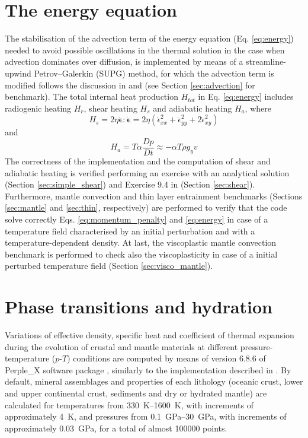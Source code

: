 \documentclass[hidelinks,10pt,a4paper]{article}
\begin{document}
\section{The energy equation}\label{sec:en_eq}
The stabilisation of the advection term of the energy equation (Eq. \ref{eq:energy}) needed to avoid possible oscillations in the thermal solution in the case
when advection dominates over diffusion, is implemented by means of a streamline-upwind Petrov–Galerkin (SUPG) method, for which the advection term is modified
follows the discussion in \citet{Thieulot2011} and \citet{Thieulot2014} (see Section \ref{sec:advection} for benchmark). The total internal heat production
$H_{tot}$ in Eq. \ref{eq:energy} includes radiogenic heating $H_r$, shear heating $H_s$ and adiabatic heating $H_a$, where
\begin{equation}\label{eq:shear}
H_s=2\eta \dot{\bm{\epsilon}} : \dot{\bm{\epsilon}} = 2\eta(\dot{\epsilon}_{xx}^2+\dot{\epsilon}_{yy}^2+2\dot{\epsilon}_{xy}^2)
\end{equation}
and
\begin{equation}\label{eq:adiabatic}
H_a=T \alpha \frac{Dp}{Dt} \approx -\alpha T \rho g_y v
\end{equation}
The correctness of the implementation and the computation of shear and adiabatic heating is verified performing an exercise with an analytical solution
(Section \ref{sec:simple_shear}) and Exercise 9.4 in \citet{Gerya2010b} (Section \ref{sec:shear}). Furthermore, mantle convection and thin layer entrainment
benchmarks (Sections \ref{sec:mantle} and \ref{sec:thin}, respectively) are performed to verify that the code solve correctly Eqs. \ref{eq:momentum_penalty}
and \ref{eq:energy} in case of a temperature field characterised by an initial perturbation and with a temperature-dependent density. At last, the viscoplastic
mantle convection benchmark is performed to check also the viscoplasticity in case of a initial perturbed temperature field (Section \ref{sec:visco_mantle}).

\section{Phase transitions and hydration}\label{sec:phase}
Variations of effective density, specific heat and coefficient of thermal expansion during the evolution of crustal and mantle materials at different
pressure-temperature ($p$-$T$) conditions are computed by means of version 6.8.6 of Perple\_X software package \citep{Connolly2005}, similarly to the
implementation described in \citet{Marotta2020}. By default, mineral assemblages and properties of each lithology (oceanic crust, lower and upper continental
crust, sediments and dry or hydrated mantle) are calculated for temperatures from \SIrange{330}{1600}{\kelvin}, with increments of approximately \SI{4}{\kelvin},
and pressures from \SIrange{0.1}{30}{\giga\pascal}, with increments of approximately \SI{0.03}{\giga\pascal}, for a total of almost 100000 points.
\end{document}
